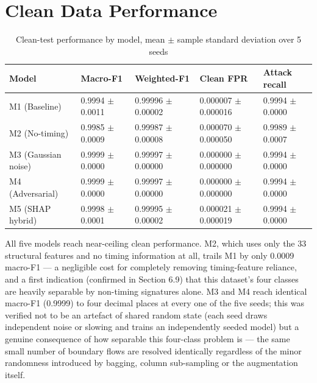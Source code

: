 \documentclass[12pt,a4paper]{report}
\begin{document}
\section{Clean Data Performance}
\begin{table}[h]\centering
\caption{Clean-test performance by model, mean $\pm$ sample standard deviation over 5 seeds}
\begin{tabularx}{\linewidth}{XXXXX}
\toprule
\textbf{Model} & \textbf{Macro-F1} & \textbf{Weighted-F1} & \textbf{Clean FPR} & \textbf{Attack recall} \\
\midrule
M1 (Baseline) & 0.9994 $\pm$ 0.0011 & 0.99996 $\pm$ 0.00002 & 0.000007 $\pm$ 0.000016 & 0.9994 $\pm$ 0.0000 \\
M2 (No-timing) & 0.9985 $\pm$ 0.0009 & 0.99987 $\pm$ 0.00008 & 0.000070 $\pm$ 0.000050 & 0.9989 $\pm$ 0.0007 \\
M3 (Gaussian noise) & 0.9999 $\pm$ 0.0000 & 0.99997 $\pm$ 0.00000 & 0.000000 $\pm$ 0.000000 & 0.9994 $\pm$ 0.0000 \\
M4 (Adversarial) & 0.9999 $\pm$ 0.0000 & 0.99997 $\pm$ 0.00000 & 0.000000 $\pm$ 0.000000 & 0.9994 $\pm$ 0.0000 \\
M5 (SHAP hybrid) & 0.9998 $\pm$ 0.0001 & 0.99995 $\pm$ 0.00002 & 0.000021 $\pm$ 0.000019 & 0.9994 $\pm$ 0.0000 \\
\bottomrule
\end{tabularx}
\end{table}
All five models reach near-ceiling clean performance. M2, which uses only the 33 structural features and no timing information at all, trails M1 by only 0.0009 macro-F1 --- a negligible cost for completely removing timing-feature reliance, and a first indication (confirmed in Section 6.9) that this dataset's four classes are heavily separable by non-timing signatures alone. M3 and M4 reach identical macro-F1 (0.9999) to four decimal places at every one of the five seeds; this was verified not to be an artefact of shared random state (each seed draws independent noise or slowing and trains an independently seeded model) but a genuine consequence of how separable this four-class problem is --- the same small number of boundary flows are resolved identically regardless of the minor randomness introduced by bagging, column sub-sampling or the augmentation itself.
\end{document}
